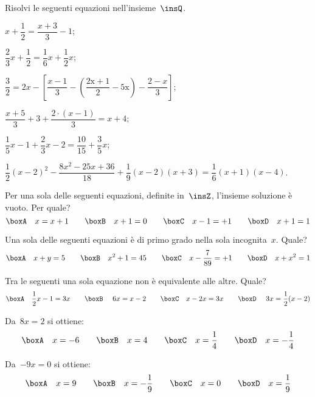 \begin{esercizio}
\label{ese:13.43}%
Risolvi le seguenti equazioni nell'insieme~$\insQ$.
\begin{enumeratea}
\spazielenx
 \item $x+\dfrac{1}{2}=\dfrac{x+3}{3}-1$;
 \item $\dfrac{2}{3}x+\dfrac{1}{2}=\dfrac{1}{6}x+\dfrac{1}{2}x$;
 \item $\dfrac{3}{2}=2x-\left[\dfrac{x-1}{3}-\left(\dfrac{\text{2x}+1}{2}-\text{5x}\right)-\dfrac{2-x}{3}\right]$;
 \item $\dfrac{x+5}{3}+3+\dfrac{2\cdot \left(x-1\right)}{3}=x+4$;
 \item $\dfrac{1}{5}x-1+\dfrac{2}{3}x-2=\dfrac{10}{15}+\dfrac{3}{5}x$;
 \item $\dfrac{1}{2}(x-2)^{2}-\dfrac{8x^{2}-25x+36}{18}+\dfrac{1}{9}(x-2)(x+3)=\dfrac{1}{6}(x+1)(x-4)$.
\end{enumeratea}
\end{esercizio}

\begin{esercizio}
\label{ese:13.44}
Per una sola delle seguenti equazioni, definite in~$\insZ$, l'insieme soluzione è vuoto. Per quale?
\[\boxA\quad x=x+1\qquad\boxB\quad x+1=0\qquad\boxC\quad x-1=+1\qquad\boxD\quad x+1=1\]
\end{esercizio}

\begin{esercizio}
\label{ese:13.45}
Una sola delle seguenti equazioni è di primo grado nella sola incognita~$x$. Quale?
\[\boxA\quad x+y=5\qquad\boxB\quad x^{2}+1=45\qquad\boxC\quad x-\dfrac{7}{89}=+1\qquad\boxD\quad x+x^{2}=1\]
\end{esercizio}

\begin{esercizio}
\label{ese:13.46}
Tra le seguenti una sola equazione non è equivalente alle altre. Quale?
\[\boxA\quad \dfrac{1}{2}x-1=3x\qquad\boxB\quad~6x=x-2\qquad\boxC\quad x-2x=3x\qquad\boxD\quad~3x=\dfrac{1}{2}(x-2)\]
\end{esercizio}

\begin{esercizio}
\label{ese:13.47}
Da~$8x=2$ si ottiene:
\[\boxA\quad x=-6\qquad\boxB\quad x=4\qquad\boxC\quad x=\dfrac{1}{4}\qquad\boxD\quad x=-{\dfrac{1}{4}}\]
\end{esercizio}

\begin{esercizio}
\label{ese:13.48}
Da~$-9x=0$ si ottiene:
\[\boxA\quad x=9\qquad\boxB\quad x=-{\dfrac{1}{9}}\qquad\boxC\quad x=0\qquad\boxD\quad x=\dfrac{1}{9}\]
\end{esercizio}

